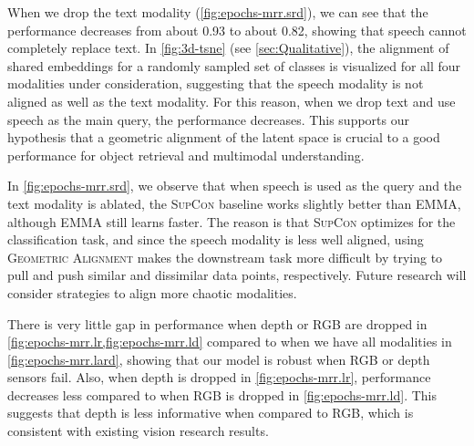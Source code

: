 \documentclass[10pt]{article} %
\newcommand{\todocmi}[1]{\todo[inline,color=green!40]{\small #1 -- Cynthia}}
\newcommand{\ours}{\textsc{EMMA}}
\newcommand{\geom}{\textsc{Geometric Alignment}}
\newcommand{\supcon}{\textsc{SupCon}}
\begin{document}
When we drop the text modality (\cref{fig:epochs-mrr.srd}), we can see that the performance decreases from about 0.93 to about 0.82, showing that speech cannot completely replace text. In \cref{fig:3d-tsne} (see \cref{sec:Qualitative}), the alignment of shared embeddings for a randomly sampled set of classes is visualized for all four modalities under consideration, suggesting that the speech modality is not aligned as well as the text modality. For this reason, when we drop text and use speech as the main query, the performance decreases. This supports our hypothesis that a geometric alignment of the latent space is crucial to a good performance for object retrieval and multimodal understanding.

In \cref{fig:epochs-mrr.srd}, we observe that when speech is used as the query and the text modality is ablated, the \supcon{} baseline works slightly better than \ours{}, although \ours{} still learns faster. The reason is that \supcon{} optimizes for the classification task, and since the speech modality is less well aligned, using \geom{} makes the downstream task more difficult by trying to pull and push similar and dissimilar data points, respectively. Future research will consider strategies to align more chaotic modalities.

There is very little gap in performance when depth or RGB are dropped in \cref{fig:epochs-mrr.lr,fig:epochs-mrr.ld} compared to when we have all modalities in \cref{fig:epochs-mrr.lard}, showing that our model is robust when RGB or depth sensors fail. Also, when depth is dropped in \cref{fig:epochs-mrr.lr}, performance decreases less compared to when RGB is dropped in \cref{fig:epochs-mrr.ld}. This suggests that depth is less informative when compared to RGB, which is consistent with existing vision research results. 

\end{document}
